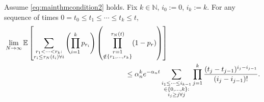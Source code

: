 \begin{lemma}\label{thm:inductionUB}
Assume \eqref{eq:mainthmcondition2} holds.
Fix $k \in \mathbb{N}$, $i_0:=0$, $i_k:=k$. For any sequence of times
$0 = t_0 \leq t_1 \leq \cdots \leq t_k \leq t$,
\begin{align*}
&\lim_{N\to\infty} \E \left[ 
        \sum_{\substack{r_1 <\dots< r_k :\\ r_i \leq \tau_N(t_i) \forall i}}
        \left( \prod_{i=1}^k p_{r_i} \right)
        \left( \prod_{\substack{r=1 \\ \notin \{r_1,\dots,r_k\} }}^{\tau_N(t)} 
        (1-p_r) \right) \right] \\
&\hspace{6cm}\leq \alpha_n^k e^{-\alpha_n t}
        \sum_{\substack{i_1\leq \dots\leq i_{k-1}\\ \in \{0,\dots,k\} :
        \\ i_j \geq j \forall j}} 
        \prod_{j=1}^k \frac{(t_j - t_{j-1})^{i_j - i_{j-1}}}{(i_j - i_{j-1})! } .
\end{align*}
\end{lemma}

